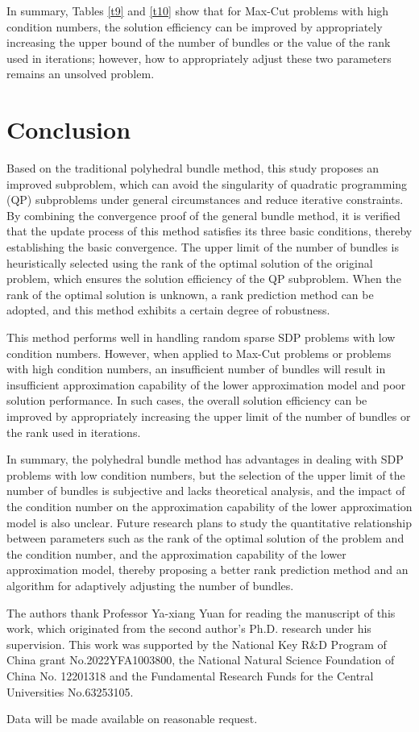 \documentclass{jcmlatex}
\begin{document}
In summary, Tables \ref{t9} and \ref{t10} show that for Max-Cut problems with high condition numbers, the solution efficiency can be improved by appropriately increasing the upper bound of the number of bundles or the value of the rank used in iterations; however, how to appropriately adjust these two parameters remains an unsolved problem.
\section{Conclusion}\label{sec:6}
Based on the traditional polyhedral bundle method, this study proposes an improved subproblem, which can avoid the singularity of quadratic programming (QP) subproblems under general circumstances and reduce iterative constraints. By combining the convergence proof of the general bundle method, it is verified that the update process of this method satisfies its three basic conditions, thereby establishing the basic convergence. The upper limit of the number of bundles is heuristically selected using the rank of the optimal solution of the original problem, which ensures the solution efficiency of the QP subproblem. When the rank of the optimal solution is unknown, a rank prediction method can be adopted, and this method exhibits a certain degree of robustness.

This method performs well in handling random sparse SDP problems with low condition numbers. However, when applied to Max-Cut problems or problems with high condition numbers, an insufficient number of bundles will result in insufficient approximation capability of the lower approximation model and poor solution performance. In such cases, the overall solution efficiency can be improved by appropriately increasing the upper limit of the number of bundles or the rank used in iterations.

In summary, the polyhedral bundle method has advantages in dealing with SDP problems with low condition numbers, but the selection of the upper limit of the number of bundles is subjective and lacks theoretical analysis, and the impact of the condition number on the approximation capability of the lower approximation model is also unclear. Future research plans to study the quantitative relationship between parameters such as the rank of the optimal solution of the problem and the condition number, and the approximation capability of the lower approximation model, thereby proposing a better rank prediction method and an algorithm for adaptively adjusting the number of bundles.







 The authors thank Professor Ya-xiang Yuan for reading the manuscript of this work, which originated from the second author's Ph.D. research under his supervision. This work was supported by the National Key R\&D Program of China grant No.2022YFA1003800, the National Natural Science Foundation of China No. 12201318 and the Fundamental Research Funds for the Central Universities No.63253105.

 Data will be made available on reasonable request.

\end{document}
